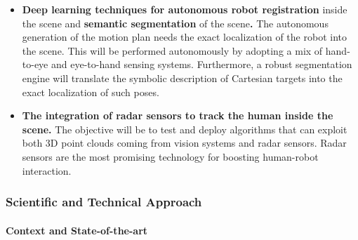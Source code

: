\begin{itemize}
\begin{itemize}
    the motion planning will be designed as modules running over
    different computation units according to the goals (Figure 1). For
    example, on the one hand, the motion planner could run under the
    \textbf{Open IPC} where the user interface is running when the plan
    can be computed asynchronously (offline or online), and the
    computation latency is not critical. On the other hand, the motion
    planning problem must be solved in the \textbf{Core IPC} (Figure 1),
    when the interpolation must be solved in synchronously to the
    process execution (e.g., visual servoing)
  \end{itemize}
\item
  \textbf{Deep learning techniques for autonomous robot registration}
  inside the scene and \textbf{semantic segmentation} of the
  scene\textbf{.} The autonomous generation of the motion plan needs the
  exact localization of the robot into the scene. This will be performed
  autonomously by adopting a mix of hand-to-eye and eye-to-hand sensing
  systems. Furthermore, a robust segmentation engine will translate the
  symbolic description of Cartesian targets into the exact localization
  of such poses.
\item
  \textbf{The integration of radar sensors to track the human inside the
  scene.} The objective will be to test and deploy algorithms that can
  exploit both 3D point clouds coming from vision systems and radar
  sensors. Radar sensors are the most promising technology for boosting
  human-robot interaction.
\end{itemize}

\subsubsection{Scientific and Technical
Approach}\label{scientific-and-technical-approach-1}

\paragraph{Context and
State-of-the-art}\label{context-and-state-of-the-art-1}

